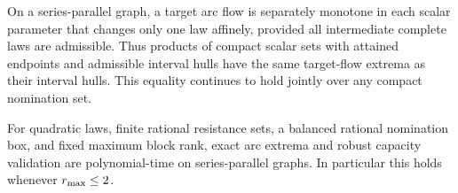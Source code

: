 \begin{corollary}
\label{cor:a-bound-finite-positive}
On a series-parallel graph, a target arc flow is separately monotone
in each scalar parameter that changes only one law affinely, provided
all intermediate complete laws are admissible. Thus products of compact
scalar sets with attained endpoints and admissible interval hulls have
the same target-flow extrema as their interval hulls. This equality
continues to hold jointly over any compact nomination set.

For quadratic laws, finite rational resistance sets, a balanced rational
nomination box, and fixed maximum block rank, exact arc extrema and
robust capacity validation are polynomial-time on series-parallel graphs.
In particular this holds whenever $r_{\max}\le2$.
\end{corollary}
